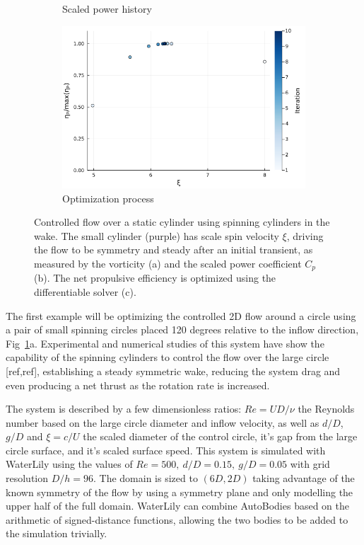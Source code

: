 \documentclass[final,3p,times]{elsarticle}
\begin{document}
\begin{figure}
\begin{subfigure}[b]{0.45\linewidth}
        \caption{Scaled power history}
    \end{subfigure}\hspace{20}
    \begin{subfigure}[b]{0.45\linewidth}
        \centering
        \includegraphics[width=\linewidth]{jl/examples/SpinOptim.png}        
        \caption{Optimization process}
    \end{subfigure}
    \caption{Controlled flow over a static cylinder using spinning cylinders in the wake. The small cylinder (purple) has scale spin velocity $\xi$, driving the flow to be symmetry and steady after an initial transient, as measured by the vorticity (a) and the scaled power coefficient $C_p$ (b). The net propulsive efficiency is optimized using the differentiable solver (c).}
    \label{fig:spinning_circle}
\end{figure}

The first example will be optimizing the controlled 2D flow around a circle using a pair of small spinning circles placed 120 degrees relative to the inflow direction, Fig~\ref{fig:spinning_circle}a. Experimental and numerical studies of this system have show the capability of the spinning cylinders to control the flow over the large circle [ref,ref], establishing a steady symmetric wake, reducing the system drag and even producing a net thrust as the rotation rate is increased.

The system is described by a few dimensionless ratios: $Re=UD/\nu$ the Reynolds number based on the large circle diameter and inflow velocity, as well as $d/D$, $g/D$ and $\xi=c/U$ the scaled diameter of the control circle, it's gap from the large circle surface, and it's scaled surface speed. This system is simulated with WaterLily using the values of $Re=500,\ d/D=0.15,\ g/D=0.05$ with grid resolution $D/h=96$. The domain is sized to $(6D,2D)$ taking advantage of the known symmetry of the flow by using a symmetry plane and only modelling the upper half of the full domain. WaterLily can combine AutoBodies based on the arithmetic of signed-distance functions, allowing the two bodies to be added to the simulation trivially.
\end{document}
